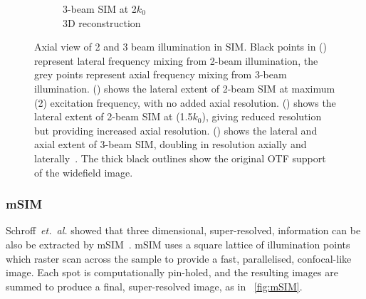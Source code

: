 \begin{figure}
\begin{subfigure}[t]{0.48\textwidth}
        \caption{3-beam SIM at \SI{2}{\times}\(k_0\)\\
        3D reconstruction}\label{fig:sim_axial_3_beam_3d}
    \end{subfigure}\hfill
    \caption[Axial view of 2 and 3 beam illumination in \gls{SIM}]{
    Axial view of 2 and 3 beam illumination in \gls{SIM}.
    Black points in () represent lateral frequency mixing from 2-beam illumination, the grey points represent axial frequency mixing from 3-beam illumination.
    () shows the lateral extent of 2-beam \gls{SIM} at maximum (\SI{2}{\times}) excitation frequency, with no added axial resolution.
    () shows the lateral extent of 2-beam \gls{SIM} at (\SI{1.5}{\times}\(k_0\)), giving reduced resolution but providing increased axial resolution.
     () shows the lateral and axial extent of 3-beam \gls{SIM}, doubling in resolution axially and laterally~\cite{gustafssonSurpassingLateralResolution2000}.
     The thick black outlines show the original OTF support of the widefield image.
    }\label{fig:sim_axial}
\end{figure}

\subsubsection{\gls{mSIM}}\label{sec:msim}

Schroff~\emph{et.~al.} showed that three dimensional, super-resolved, information can be also be extracted by \gls{mSIM}~\cite{yorkResolutionDoublingLive2012}.
\gls{mSIM} uses a square lattice of illumination points which raster scan across the sample to provide a fast, parallelised, confocal-like image.
Each spot is computationally pin-holed, and the resulting images are summed to produce a final, super-resolved image, as in \figurename~\ref{fig:mSIM}.

